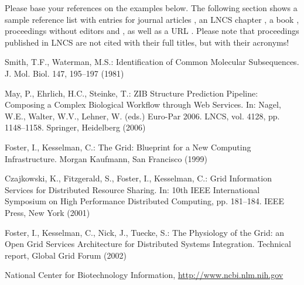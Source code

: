 \documentclass[runningheads]{llncs}
\begin{document}
Please base your references on the
examples below. 
The following section shows a sample reference list with entries for
journal articles \cite{jour}, an LNCS chapter \cite{lncschap}, a book
\cite{book}, proceedings without editors \cite{proceeding1} and
\cite{proceeding2}, as well as a URL \cite{url}.
Please note that proceedings published in LNCS are not cited with their
full titles, but with their acronyms!

\begin{thebibliography}{4}

 Smith, T.F., Waterman, M.S.: Identification of Common Molecular
Subsequences. J. Mol. Biol. 147, 195--197 (1981)

 May, P., Ehrlich, H.C., Steinke, T.: ZIB Structure Prediction Pipeline:
Composing a Complex Biological Workflow through Web Services. In: Nagel,
W.E., Walter, W.V., Lehner, W. (eds.) Euro-Par 2006. LNCS, vol. 4128,
pp. 1148--1158. Springer, Heidelberg (2006)

 Foster, I., Kesselman, C.: The Grid: Blueprint for a New Computing
Infrastructure. Morgan Kaufmann, San Francisco (1999)

 Czajkowski, K., Fitzgerald, S., Foster, I., Kesselman, C.: Grid
Information Services for Distributed Resource Sharing. In: 10th IEEE
International Symposium on High Performance Distributed Computing, pp.
181--184. IEEE Press, New York (2001)

 Foster, I., Kesselman, C., Nick, J., Tuecke, S.: The Physiology of the
Grid: an Open Grid Services Architecture for Distributed Systems
Integration. Technical report, Global Grid Forum (2002)

 National Center for Biotechnology Information, \url{http://www.ncbi.nlm.nih.gov}

\end{thebibliography}
\end{document}
